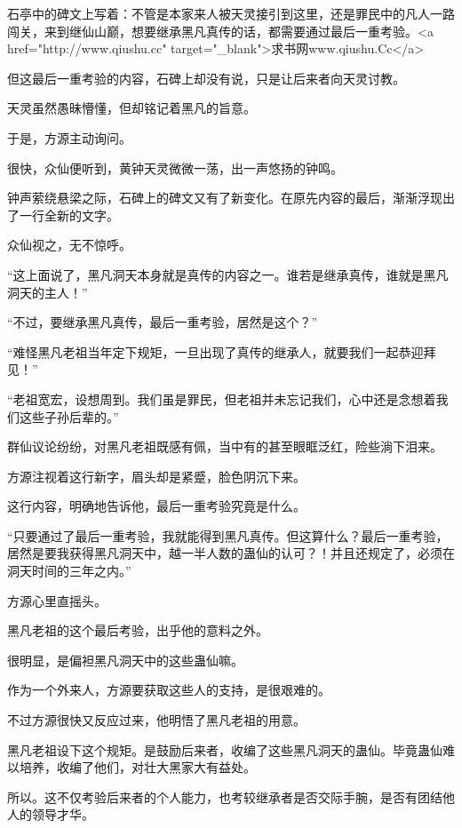 
\begin{this_body}

石亭中的碑文上写着：不管是本家来人被天灵接引到这里，还是罪民中的凡人一路闯关，来到继仙山巅，想要继承黑凡真传的话，都需要通过最后一重考验。<a href="http://www.qiushu.cc" target="\_blank">求书网www.qiushu.Cc</a>

但这最后一重考验的内容，石碑上却没有说，只是让后来者向天灵讨教。

天灵虽然愚昧懵懂，但却铭记着黑凡的旨意。

于是，方源主动询问。

很快，众仙便听到，黄钟天灵微微一荡，出一声悠扬的钟鸣。

钟声萦绕悬梁之际，石碑上的碑文又有了新变化。在原先内容的最后，渐渐浮现出了一行全新的文字。

众仙视之，无不惊呼。

“这上面说了，黑凡洞天本身就是真传的内容之一。谁若是继承真传，谁就是黑凡洞天的主人！”

“不过，要继承黑凡真传，最后一重考验，居然是这个？”

“难怪黑凡老祖当年定下规矩，一旦出现了真传的继承人，就要我们一起恭迎拜见！”

“老祖宽宏，设想周到。我们虽是罪民，但老祖并未忘记我们，心中还是念想着我们这些子孙后辈的。”

群仙议论纷纷，对黑凡老祖既感有佩，当中有的甚至眼眶泛红，险些淌下泪来。

方源注视着这行新字，眉头却是紧蹙，脸色阴沉下来。

这行内容，明确地告诉他，最后一重考验究竟是什么。

“只要通过了最后一重考验，我就能得到黑凡真传。但这算什么？最后一重考验，居然是要我获得黑凡洞天中，越一半人数的蛊仙的认可？！并且还规定了，必须在洞天时间的三年之内。”

方源心里直摇头。

黑凡老祖的这个最后考验，出乎他的意料之外。

很明显，是偏袒黑凡洞天中的这些蛊仙嘛。

作为一个外来人，方源要获取这些人的支持，是很艰难的。

不过方源很快又反应过来，他明悟了黑凡老祖的用意。

黑凡老祖设下这个规矩。是鼓励后来者，收编了这些黑凡洞天的蛊仙。毕竟蛊仙难以培养，收编了他们，对壮大黑家大有益处。

所以。这不仅考验后来者的个人能力，也考较继承者是否交际手腕，是否有团结他人的领导才华。


\end{this_body}
